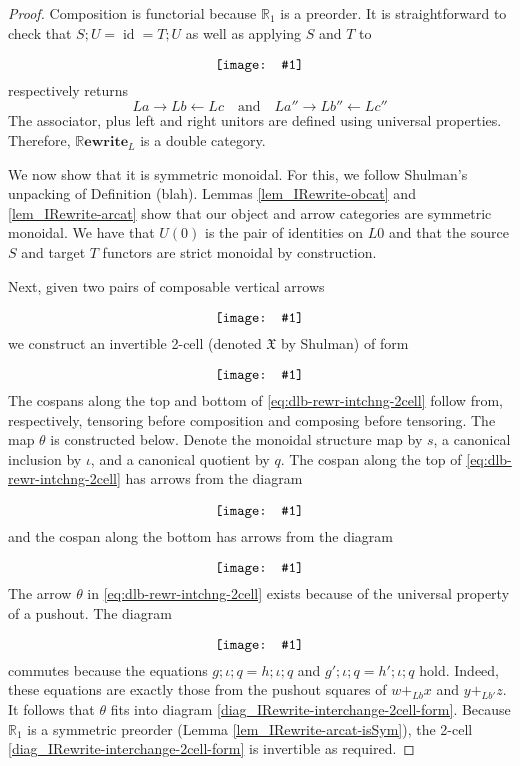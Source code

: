 \documentclass{amsart}
\newcommand{\RR}{\mathbb{R}}
\newcommand{\diagram}[1]{\raisebox{-0.5\height}{\texttt{[image: \#1]}}}
\newcommand{\RRewrite}{ \mathbb{R}\mathbf{ewrite} }
\newcommand{\edit}[1]{\textcolor{editcolour}{(#1)}}
\DeclareMathOperator{\id}{id}
\theoremstyle{remark}
\theoremstyle{definition}
\begin{document}
\begin{proof}
  
  Composition is functorial because $ \RR_1 $ is a preorder. It is
  straightforward to check that $ S;U = \id = T;U$ as well as applying
  $ S $ and $ T $ to
  \[
    \diagram{diag_nlr_dbl-rewrite-deconstructed-composite}
  \]
  respectively returns
  \[
    La \to Lb \gets Lc \quad \text{and} \quad La'' \to Lb'' \gets Lc''
  \]
  The associator, plus left and right unitors are defined using
  universal properties. Therefore, $ \RRewrite_L $ is a double
  category.
	
  We now show that it is symmetric monoidal.  For this, we follow
  Shulman's unpacking of Definition \edit{blah}.  
  Lemmas \ref{lem_IRewrite-obcat} and \ref{lem_IRewrite-arcat} show
  that our object and arrow categories are symmetric monoidal.  We
  have that $ U ( 0 ) $ is the pair of identities on $ L 0 $ and that
  the source $ S $ and target $ T $ functors are strict monoidal by
  construction.
	
  Next, given two pairs of composable vertical arrows
  \[
    \diagram{diag_nlr_dbl-rewrite-interchange}
  \]
  we construct an invertible 2-cell (denoted $ \mathfrak{X} $ by
  Shulman) of form
  \begin{equation} \label{eq:dlb-rewr-intchng-2cell}
    \diagram{diag_nlr_dbl-rewrite-interchange-2cell}
  \end{equation}
  The cospans along the top and bottom of
  \eqref{eq:dlb-rewr-intchng-2cell} follow from, respectively,
  tensoring before composition and composing before tensoring. The map
  $ \theta $ is constructed below. Denote the monoidal structure map
  by $ s $, a canonical inclusion by $ \iota $, and a canonical
  quotient by $ q $.  The cospan along the top of
  \eqref{eq:dlb-rewr-intchng-2cell} has arrows from the diagram
  \[
    \diagram{diag_nlr_dbl-rewrite-tensor-compose}
  \]
  and the cospan along the bottom has arrows from the diagram
  \[
    \diagram{diag_nlr_dbl-rewrite-compose-tensor}
  \]
  The arrow $ \theta $ in \eqref{eq:dlb-rewr-intchng-2cell} exists
  because of the universal property of a pushout.  The diagram
  \[
    \diagram{diag_nlr_dbl-rewrite-pushout-competetor}
  \]
  commutes because the equations $ g ; \iota ; q = h ; \iota ; q $ and
  $ g' ; \iota ; q = h' ; \iota ; q $ hold.  Indeed, these equations
  are exactly those from the pushout squares of $ w +_{Lb} x $ and
  $ y +_{Lb'} z $.  It follows that $ \theta $ fits into diagram
  \eqref{diag_IRewrite-interchange-2cell-form}. Because $ \RR_1 $ is a
  symmetric preorder (Lemma \ref{lem_IRewrite-arcat-isSym}), the
  2-cell \eqref{diag_IRewrite-interchange-2cell-form} is invertible as
  required.
	

\end{proof}
\end{document}
